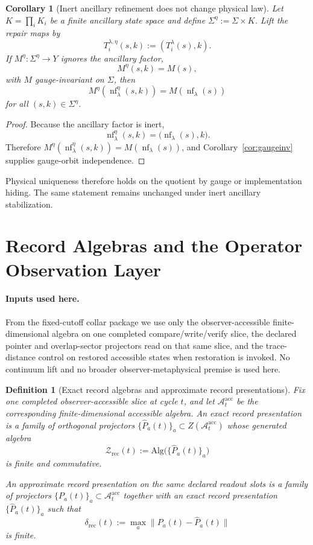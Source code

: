 \documentclass[11pt]{article}
\newtheorem{corollary}[theorem]{Corollary}
\newtheorem{definition}[theorem]{Definition}
\theoremstyle{remark}
\theoremstyle{plain}
\begin{document}
\begin{corollary}[Inert ancillary refinement does not change physical law]\label{cor:ancilla}
Let \(K=\prod_i K_i\) be a finite ancillary state space and define \(\Sigma^\eta:=\Sigma\times K\). Lift the repair maps by
\[
T_i^{\lambda,\eta}(s,k):=(T_i^\lambda(s),k).
\]
If \(M^\eta:\Sigma^\eta\to Y\) ignores the ancillary factor,
\[
M^\eta(s,k)=M(s),
\]
with \(M\) gauge-invariant on \(\Sigma\), then
\[
M^\eta(\operatorname{nf}_\lambda^\eta(s,k))
=
M(\operatorname{nf}_\lambda(s))
\]
for all \((s,k)\in\Sigma^\eta\).
\end{corollary}

\begin{proof}
Because the ancillary factor is inert,
\[
\operatorname{nf}_\lambda^\eta(s,k)=\bigl(\operatorname{nf}_\lambda(s),k\bigr).
\]
Therefore \(M^\eta(\operatorname{nf}_\lambda^\eta(s,k))=M(\operatorname{nf}_\lambda(s))\), and Corollary~\ref{cor:gaugeinv} supplies gauge-orbit independence.
\end{proof}

Physical uniqueness therefore holds on the quotient by gauge or implementation hiding. The same
statement remains unchanged under inert ancillary stabilization.


\section{Record Algebras and the Operator Observation Layer}

\paragraph{Inputs used here.}
From the fixed-cutoff collar package we use only the observer-accessible finite-dimensional algebra
on one completed compare/write/verify slice, the declared pointer and overlap-sector projectors
read on that same slice, and the trace-distance control on restored accessible states when
restoration is invoked. No continuum lift and no broader observer-metaphysical premise is used
here.

\begin{definition}[Exact record algebras and approximate record presentations]\label{def:lattice}
Fix one completed observer-accessible slice at cycle \(t\), and let
\(\mathcal A_t^{\mathrm{acc}}\) be the corresponding finite-dimensional accessible algebra. An
\emph{exact record presentation} is a family of orthogonal projectors
\(\{\widehat P_a(t)\}_a\subset Z(\mathcal A_t^{\mathrm{acc}})\) whose generated algebra
\[
\mathcal Z_{\mathrm{rec}}(t)
:=
\mathrm{Alg}\bigl(\{\widehat P_a(t)\}_a\bigr)
\]
is finite and commutative.

An \emph{approximate record presentation} on the same declared readout slots is a family of
projectors \(\{P_a(t)\}_a\subset \mathcal A_t^{\mathrm{acc}}\) together with an exact record
presentation \(\{\widehat P_a(t)\}_a\) such that
\[
\delta_{\mathrm{rec}}(t)
:=
\max_a \|P_a(t)-\widehat P_a(t)\|
\]
is finite.
\end{definition}
\end{document}
